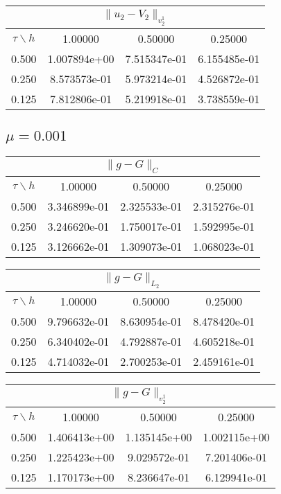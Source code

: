 \begin{center}
\begin{tabular}{||c|c|c|c||}
\hline
\hline
\multicolumn{4}{||c||}{$\|u_2-V_2\| _{v_2^1}$}\\ 
\hline
\hline
$\tau \backslash h$ & 1.00000 & 0.50000 & 0.25000\\ 
\hline 
0.500& 1.007894e+00 &7.515347e-01 &6.155485e-01 \\ 
\hline
0.250& 8.573573e-01 &5.973214e-01 &4.526872e-01 \\ 
\hline
0.125& 7.812806e-01 &5.219918e-01 &3.738559e-01 \\ 
\hline
\hline
\end{tabular}
\end{center}

\subsection{$\mu=0.001$}   
\begin{center}
\begin{tabular}{||c|c|c|c||}
\hline
\hline
\multicolumn{4}{||c||}{$\|g-G\| _{C}$}\\
\hline
\hline
$\tau \backslash h$ & 1.00000 & 0.50000 & 0.25000\\ 
\hline 
0.500& 3.346899e-01 &2.325533e-01 &2.315276e-01 \\
\hline
0.250& 3.246620e-01 &1.750017e-01 &1.592995e-01 \\ 
\hline
0.125& 3.126662e-01 &1.309073e-01 &1.068023e-01 \\ 
\hline
\hline
\end{tabular}
\end{center}
\begin{center}
\begin{tabular}{||c|c|c|c||}
\hline
\hline
\multicolumn{4}{||c||}{$\|g-G\| _{L_2}$}\\ 
\hline
\hline 
$\tau \backslash h$ & 1.00000 & 0.50000 & 0.25000\\ 
\hline 
0.500& 9.796632e-01 &8.630954e-01 &8.478420e-01 \\
\hline
0.250& 6.340402e-01 &4.792887e-01 &4.605218e-01 \\ 
\hline
0.125& 4.714032e-01 &2.700253e-01 &2.459161e-01 \\ 
\hline
\hline
\end{tabular}
\end{center}
\begin{center}
\begin{tabular}{||c|c|c|c||}
\hline
\hline
\multicolumn{4}{||c||}{$\|g-G\| _{v_2^1}$}\\ 
\hline 
\hline
$\tau \backslash h$ & 1.00000 & 0.50000 & 0.25000\\ 
\hline 
0.500& 1.406413e+00 &1.135145e+00 &1.002115e+00 \\
\hline
0.250& 1.225423e+00 &9.029572e-01 &7.201406e-01 \\ 
\hline
0.125& 1.170173e+00 &8.236647e-01 &6.129941e-01 \\ 
\hline
\hline
\end{tabular}
\end{center}
